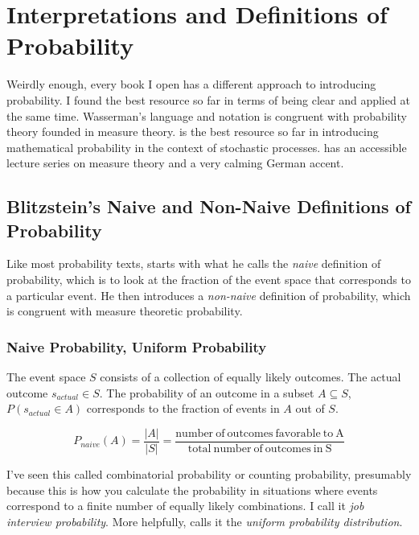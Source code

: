 \section{Interpretations and Definitions of Probability}

Weirdly enough, every book I open has a different approach to introducing probability. I found  the best resource so far in terms of being clear and applied at the same time. Wasserman's language and notation is congruent with probability theory founded in measure theory.  is the best resource so far in introducing mathematical probability in the context of stochastic processes.  has an accessible lecture series on measure theory and a very calming German accent.


\subsection{Blitzstein's Naive and Non-Naive Definitions of Probability}
Like most probability texts,  starts with what he calls the \textit{naive} definition of probability, which is to look at the fraction of the event space that corresponds to a particular event. He then introduces a \textit{non-naive} definition of probability, which is congruent with measure theoretic probability.

\subsubsection{Naive Probability, Uniform Probability}
The event space $S$ consists of a collection of equally likely outcomes. The actual outcome $s_{actual} \in S$. The probability of an outcome in a subset $A\subseteq S$, $P(s_{actual}\in A)$ corresponds to the fraction of events in $A$ out of $S$.

\begin{equation}
P_{naive}(A) = \frac{|A|}{|S|} = \frac{\mathrm{number\ of\ outcomes\ favorable\ to\ A}}{\mathrm{total\ number\ of\ outcomes\ in\ S}}
\end{equation}

I've seen this called combinatorial probability or counting probability, presumably because this is how you calculate the probability in situations where events correspond to a finite number of equally likely combinations. I call it \textit{job interview probability}. More helpfully,  calls it the \textit{uniform probability distribution}.

